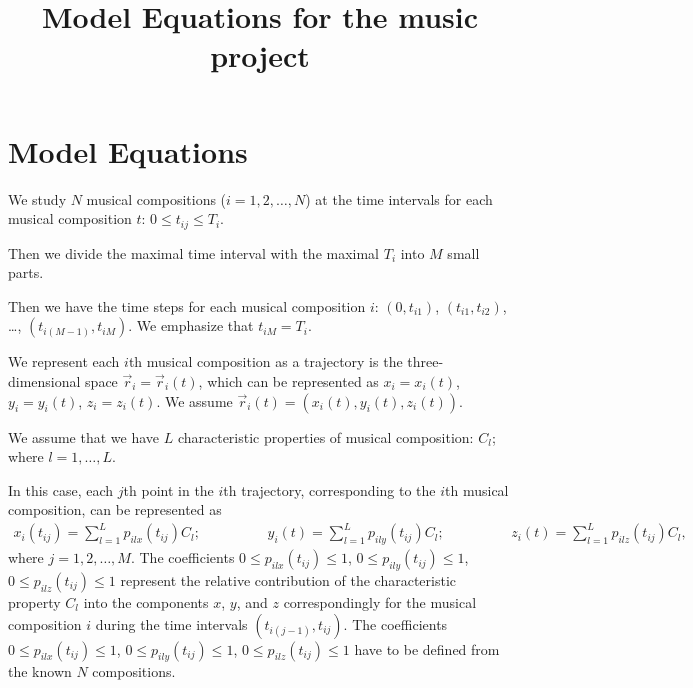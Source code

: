 \documentclass[preprintnumbers,amsmath,amssymb]{revtex4}
\begin{document}
\title{Model Equations for the music project}

\author{}








 \maketitle

\section{Model Equations}


We study $N$ musical compositions ($i = 1,2, \ldots, N$) at the time
intervals for each musical composition $t$: $0  \leq t_{ij} \leq
T_{i}$.

Then we divide the maximal time interval with the maximal $T_{i}$
into $M$ small parts.

Then we have the time steps for each musical composition $i$: $(0,
t_{i1})$, $(t_{i1}, t_{i2})$, \ldots,  $(t_{i(M-1)}, t_{iM})$.  We emphasize that $t_{iM} = T_{i}$.

We represent each $i$th musical composition as a trajectory is the
three-dimensional space $\overrightarrow{r}_{i} = \overrightarrow{r}_{i}(t)$, which can be represented as $x_{i} =
x_{i}(t)$, $y_{i} = y_{i}(t)$, $z_{i} = z_{i}(t)$. We assume $\overrightarrow{r}_{i}(t) = (x_{i}(t), y_{i}(t),
z_{i}(t))$.

We assume that we have $L$ characteristic properties of musical composition: $C_{l}$; where $l =
1, \ldots, L$.

In this case, each $j$th point in the $i$th trajectory, corresponding to the $i$th
musical composition, can be represented as
\begin{eqnarray}
\label{traj} x_{i}(t_{ij}) = \sum_{l = 1}^{L} p_{ilx}(t_{ij}) C_{l}; \hspace{2cm} y_{i}(t) = \sum_{l = 1}^{L} p_{ily}(t_{ij}) C_{l};
 \hspace{2cm} z_{i}(t) = \sum_{l = 1}^{L} p_{ilz}(t_{ij}) C_{l} ,
\end{eqnarray}
where $j = 1,2, \ldots, M$. The coefficients $0 \leq p_{ilx}(t_{ij}) \leq 1$, $0 \leq p_{ily}(t_{ij}) \leq 1$, $0 \leq p_{ilz}(t_{ij}) \leq 1$ represent
the relative contribution of the characteristic property $C_{l}$ into the components $x$, $y$, and $z$ correspondingly for the musical composition $i$ during the time intervals
$(t_{i(j-1)}, t_{ij})$. The coefficients $0 \leq p_{ilx}(t_{ij}) \leq 1$, $0 \leq p_{ily}(t_{ij}) \leq 1$, $0 \leq p_{ilz}(t_{ij}) \leq 1$ have to be defined
from the known $N$ compositions.
\end{document}
